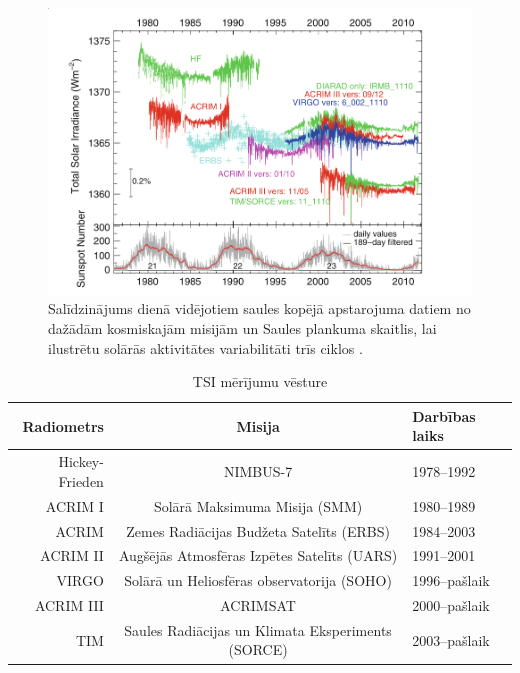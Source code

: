 \begin{figure}[h]
    \centering
    \includegraphics[width=\linewidth]{figures/misc/TSI_misijas.png}
    \caption{Salīdzinājums dienā vidējotiem saules kopējā apstarojuma datiem no dažādām kosmiskajām misijām un Saules plankuma skaitlis, lai ilustrētu solārās aktivitātes variabilitāti trīs ciklos \cite{Frohlich2012}.}
    \label{fig:TSI_misijas}
\end{figure}

\begin{table}[h]
    \caption{TSI mērījumu vēsture} %
    \begin{center}
    \begin{tabular}{| r | c | l |}
    \hline
    Radiometrs & Misija & Darbības laiks \\ \hline
    Hickey-Frieden & NIMBUS-7 & 1978--1992  \\ \hline
	ACRIM I & Solārā Maksimuma Misija (SMM) & 1980--1989 \\ \hline
	ACRIM  & Zemes Radiācijas Budžeta Satelīts (ERBS) & 1984--2003 \\ \hline
	ACRIM II & Augšējās Atmosfēras Izpētes Satelīts (UARS) & 1991--2001 \\ \hline
	VIRGO & Solārā un Heliosfēras observatorija (SOHO)& 1996--pašlaik \\ \hline
	ACRIM III & ACRIMSAT  & 2000--pašlaik \\ \hline
	TIM & Saules Radiācijas un Klimata Eksperiments (SORCE) & 2003--pašlaik\\ \hline
    \end{tabular}
    \end{center}
    \label{tab:radiometeri}
\end{table}

